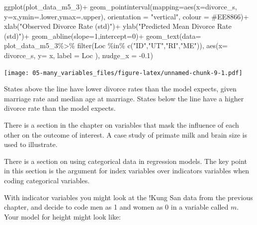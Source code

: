 \documentclass[
]{book}
\newenvironment{Shaded}{\begin{snugshade}}{\end{snugshade}}
\newcommand{\AttributeTok}[1]{\textcolor[rgb]{0.77,0.63,0.00}{#1}}
\newcommand{\DecValTok}[1]{\textcolor[rgb]{0.00,0.00,0.81}{#1}}
\newcommand{\FloatTok}[1]{\textcolor[rgb]{0.00,0.00,0.81}{#1}}
\newcommand{\FunctionTok}[1]{\textcolor[rgb]{0.00,0.00,0.00}{#1}}
\newcommand{\NormalTok}[1]{#1}
\newcommand{\SpecialCharTok}[1]{\textcolor[rgb]{0.00,0.00,0.00}{#1}}
\newcommand{\StringTok}[1]{\textcolor[rgb]{0.31,0.60,0.02}{#1}}
\begin{document}
\begin{Shaded}
\begin{Highlighting}[]
  \FunctionTok{ggplot}\NormalTok{(plot\_data\_m5\_3)}\SpecialCharTok{+}
  \FunctionTok{geom\_pointinterval}\NormalTok{(}\AttributeTok{mapping=}\FunctionTok{aes}\NormalTok{(}\AttributeTok{x=}\NormalTok{divorce\_s, }\AttributeTok{y=}\NormalTok{x,}\AttributeTok{ymin=}\NormalTok{.lower,}\AttributeTok{ymax=}\NormalTok{.upper), }
                     \AttributeTok{orientation =} \StringTok{"vertical"}\NormalTok{,}
                     \AttributeTok{colour =} \StringTok{\textquotesingle{}\#EE8866\textquotesingle{}}\NormalTok{)}\SpecialCharTok{+}
  \FunctionTok{xlab}\NormalTok{(}\StringTok{"Observed Divorce Rate (std)"}\NormalTok{)}\SpecialCharTok{+}
  \FunctionTok{ylab}\NormalTok{(}\StringTok{"Predicted Mean Divorce Rate (std)"}\NormalTok{)}\SpecialCharTok{+}
  \FunctionTok{geom\_abline}\NormalTok{(}\AttributeTok{slope=}\DecValTok{1}\NormalTok{,}\AttributeTok{intercept=}\DecValTok{0}\NormalTok{)}\SpecialCharTok{+}
  \FunctionTok{geom\_text}\NormalTok{(}\AttributeTok{data=}\NormalTok{   plot\_data\_m5\_3}\SpecialCharTok{\%\textgreater{}\%}
                      \FunctionTok{filter}\NormalTok{(Loc }\SpecialCharTok{\%in\%} \FunctionTok{c}\NormalTok{(}\StringTok{"ID"}\NormalTok{,}\StringTok{"UT"}\NormalTok{,}\StringTok{"RI"}\NormalTok{,}\StringTok{"ME"}\NormalTok{)),}
    \FunctionTok{aes}\NormalTok{(}\AttributeTok{x=}\NormalTok{ divorce\_s, }\AttributeTok{y=}\NormalTok{ x, }\AttributeTok{label =}\NormalTok{ Loc ), }\AttributeTok{nudge\_x =} \SpecialCharTok{{-}}\FloatTok{0.1}\NormalTok{)}
\end{Highlighting}
\end{Shaded}

\texttt{[image: 05-many\_variables\_files/figure-latex/unnamed-chunk-9-1.pdf]}

States above the line have lower divorce rates than the model expects, given marriage rate and median age at marriage. States below the line have a higher divorce rate than the model expects.

There is a section in the chapter on variables that mask the influence of each other on the outcome of interest. A case study of primate milk and brain size is used to illustrate.

There is a section on using categorical data in regression models. The key point in this section is the argument for index variables over indicators variables when coding categorical variables.

With indicator variables you might look at the !Kung San data from the previous chapter, and decide to code men as 1 and women as 0 in a variable called \(m\). Your model for height might look like:
\end{document}
